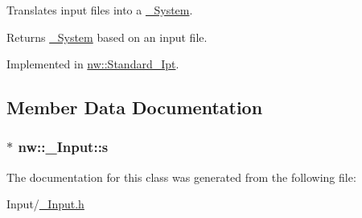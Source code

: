 Translates input files into a \hyperlink{classnw_1_1___system}{\+\_\+\+System}. 

\begin{DoxyReturn}{Returns}
\hyperlink{classnw_1_1___system}{\+\_\+\+System} based on an input file. 
\end{DoxyReturn}


Implemented in \hyperlink{classnw_1_1_standard___ipt_ae5ae0e8b67291839d71df934bfc17238}{nw\+::\+Standard\+\_\+\+Ipt}.



\subsection{Member Data Documentation}
\hypertarget{classnw_1_1___input_af4d5765ede8af8d7f981ef179683f7e5}{
\subsubsection[{s}]{$\ast$ nw\+::\+\_\+\+Input\+::s\hspace{0.3cm}{\ttfamily [protected]}}}\label{classnw_1_1___input_af4d5765ede8af8d7f981ef179683f7e5}


The documentation for this class was generated from the following file\+:\begin{DoxyCompactItemize}
\item 
Input/\hyperlink{___input_8h}{\+\_\+\+Input.\+h}\end{DoxyCompactItemize}
